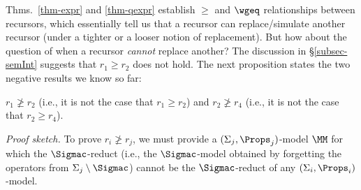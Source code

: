 Thms.~\ref{thm-expr} and \ref{thm-qexpr} establish $\geq$ and $\wgeq$
relationships between recursors, which essentially tell us that a recursor can replace/simulate another recursor (under a tighter or a looser notion of replacement). %
But how about the question of when a recursor \emph{cannot} replace another? 
The discussion in \S\ref{subsec-semInt} suggests that 
$r_1 \geq r_2$ does not hold. %
The next proposition 
states the two negative results we know so far:

\begin{prop}\rm \label{prop-negRec}
$r_1 \not\geq r_2$ (i.e., it is not the case that $r_1 \geq r_2$) 
and $r_2 \not\geq r_4$ (i.e., it is not the case that $r_2 \geq r_4$). 
\end{prop}
%
\vspace{-0.5ex}
\noindent 
\emph{Proof sketch. } 
% 
To prove $r_i \not\geq r_j$, we must provide a $(\Sigma_j,\Props_j)$-model $\MM$ for which the $\Sigmac$-reduct (i.e., the $\Sigmac$-model obtained by forgetting the operators from $\Sigma_j \setminus \Sigmac$) cannot be the $\Sigmac$-reduct of any $(\Sigma_i,\Props_i)$-model. 


 
 
